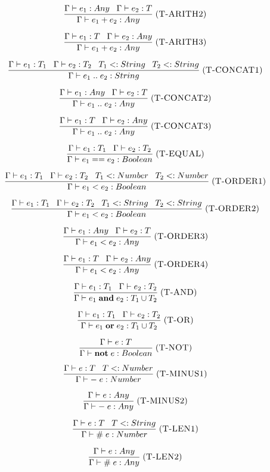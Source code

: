 \documentclass[12pt]{article}
\newcommand{\mylabel}[1]{\; (\textsc{#1})}
\newcommand{\subtype}{<:}
\newcommand{\kw}[1]{\mathbf{#1} \;}
\newcommand{\env}{\Gamma}
\begin{document}
\[
\frac{\env \vdash e_{1}:Any \;\;\;
      \env \vdash e_{2}:T}
     {\env \vdash e_{1} + e_{2} : Any}
\mylabel{T-ARITH2}
\]

\[
\frac{\env \vdash e_{1}:T \;\;\;
      \env \vdash e_{2}:Any}
     {\env \vdash e_{1} + e_{2} : Any}
\mylabel{T-ARITH3}
\]

\[
\frac{\env \vdash e_{1}:T_{1} \;\;\;
      \env \vdash e_{2}:T_{2} \;\;\;
      T_{1} \subtype String \;\;\;
      T_{2} \subtype String}
     {\env \vdash e_{1} \; {..} \;  e_{2} : String}
\mylabel{T-CONCAT1}
\]

\[
\frac{\env \vdash e_{1}:Any \;\;\;
      \env \vdash e_{2}:T}
     {\env \vdash e_{1} \; {..} \; e_{2} : Any}
\mylabel{T-CONCAT2}
\]

\[
\frac{\env \vdash e_{1}:T \;\;\;
      \env \vdash e_{2}:Any}
     {\env \vdash e_{1} \; {..} \; e_{2} : Any}
\mylabel{T-CONCAT3}
\]

\[
\frac{\env \vdash e_{1}:T_{1} \;\;\;
      \env \vdash e_{2}:T_{2}}
     {\env \vdash e_{1} == e_{2} : Boolean}
\mylabel{T-EQUAL}
\]

\[
\frac{\env \vdash e_{1}:T_{1} \;\;\;
      \env \vdash e_{2}:T_{2} \;\;\;
      T_{1} \subtype Number \;\;\;
      T_{2} \subtype Number}
     {\env \vdash e_{1} < e_{2} : Boolean}
\mylabel{T-ORDER1}
\]

\[
\frac{\env \vdash e_{1}:T_{1} \;\;\;
      \env \vdash e_{2}:T_{2} \;\;\;
      T_{1} \subtype String \;\;\;
      T_{2} \subtype String}
     {\env \vdash e_{1} < e_{2} : Boolean}
\mylabel{T-ORDER2}
\]

\[
\frac{\env \vdash e_{1}:Any \;\;\;
      \env \vdash e_{2}:T}
     {\env \vdash e_{1} < e_{2} : Any}
\mylabel{T-ORDER3}
\]

\[
\frac{\env \vdash e_{1}:T \;\;\;
      \env \vdash e_{2}:Any}
     {\env \vdash e_{1} < e_{2} : Any}
\mylabel{T-ORDER4}
\]

\[
\frac{\env \vdash e_{1}:T_{1} \;\;\;
      \env \vdash e_{2}:T_{2}}
     {\env \vdash e_{1} \; \kw{and} e_{2} : T_{1} \cup T_{2}}
\mylabel{T-AND}
\]

\[
\frac{\env \vdash e_{1}:T_{1} \;\;\;
      \env \vdash e_{2}:T_{2}}
     {\env \vdash e_{1} \; \kw{or} e_{2} : T_{1} \cup T_{2}}
\mylabel{T-OR}
\]

\[
\frac{\env \vdash e:T}
     {\env \vdash \kw{not} e : Boolean}
\mylabel{T-NOT}
\]

\[
\frac{\env \vdash e:T \;\;\;
      T \subtype Number}
     {\env \vdash - \; e : Number}
\mylabel{T-MINUS1}
\]

\[
\frac{\env \vdash e:Any}
     {\env \vdash - \; e : Any}
\mylabel{T-MINUS2}
\]

\[
\frac{\env \vdash e:T \;\;\;
      T \subtype String}
     {\env \vdash \# \; e : Number}
\mylabel{T-LEN1}
\]

\[
\frac{\env \vdash e:Any}
     {\env \vdash \# \; e : Any}
\mylabel{T-LEN2}
\]
\end{document}
